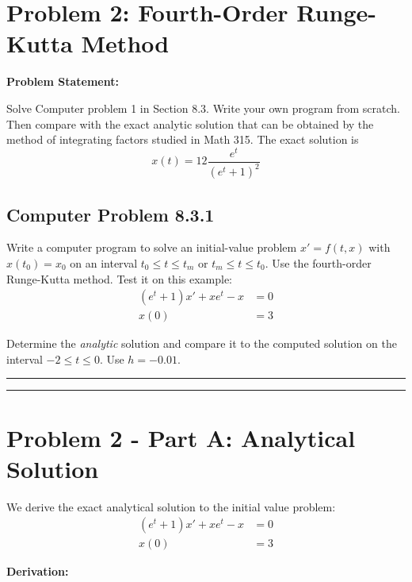 \clearpage
\section*{Problem 2: Fourth-Order Runge-Kutta Method}

\textbf{Problem Statement:} 

Solve Computer problem 1 in Section 8.3. Write your own program from scratch. Then compare with the exact analytic solution that can be obtained by the method of integrating factors studied in Math 315. The exact solution is
$$x(t) = 12\frac{e^t}{(e^t + 1)^2}$$

\subsection*{Computer Problem 8.3.1}

Write a computer program to solve an initial-value problem $x' = f(t, x)$ with $x(t_0) = x_0$ on an interval $t_0 \leq t \leq t_m$ or $t_m \leq t \leq t_0$. Use the fourth-order Runge-Kutta method. Test it on this example:
\begin{align*}
(e^t + 1)x' + xe^t - x &= 0 \\
x(0) &= 3
\end{align*}

Determine the \textit{analytic} solution and compare it to the computed solution on the interval $-2 \leq t \leq 0$. Use $h = -0.01$.

\noindent\rule{\textwidth}{0.4pt}

\vspace{1em}

\noindent\rule{\textwidth}{0.4pt}

\clearpage
\section*{Problem 2 - Part A: Analytical Solution}

We derive the exact analytical solution to the initial value problem:
\begin{align*}
(e^t + 1)x' + xe^t - x &= 0 \\
x(0) &= 3
\end{align*}

\textbf{Derivation:}

